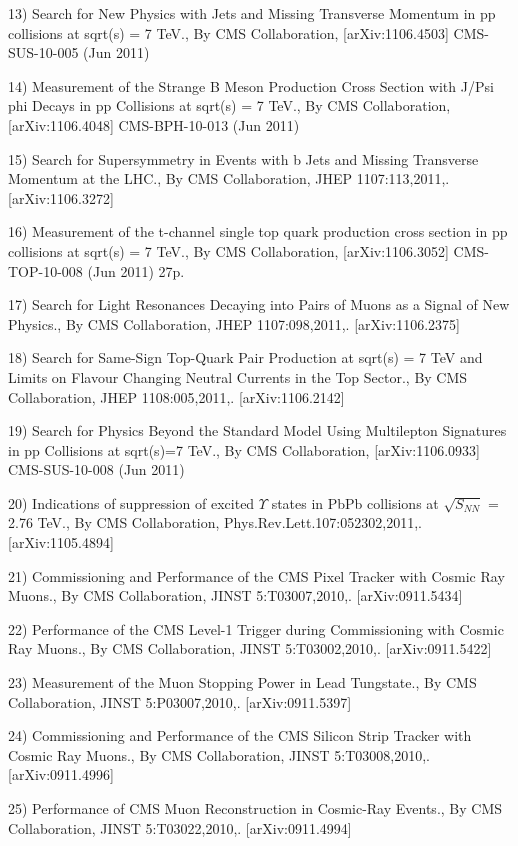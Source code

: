 \documentclass[10pt]{article}
\newenvironment{outerlist}[1][\enskip\textbullet]%
        {\begin{itemize}[#1]}{\end{itemize}%
         \vspace{-.6\baselineskip}}
\newenvironment{innerlist}[1][\enskip\textbullet]%
        {\begin{compactitem}[#1]}{\end{compactitem}}
\begin{document}
\begin{outerlist}
\begin{innerlist}
\item 13) Search for New Physics with Jets and Missing Transverse Momentum in pp collisions at sqrt(s) = 7 TeV., By CMS Collaboration, [arXiv:1106.4503] CMS-SUS-10-005 (Jun 2011)
\item 14) Measurement of the Strange B Meson Production Cross Section with J/Psi phi Decays in pp Collisions at sqrt(s) = 7 TeV., By CMS Collaboration, [arXiv:1106.4048] CMS-BPH-10-013 (Jun 2011)
\item 15) Search for Supersymmetry in Events with b Jets and Missing Transverse Momentum at the LHC., By CMS Collaboration, JHEP 1107:113,2011,. [arXiv:1106.3272]
\item 16) Measurement of the t-channel single top quark production cross section in pp collisions at sqrt(s) = 7 TeV., By CMS Collaboration, [arXiv:1106.3052] CMS-TOP-10-008 (Jun 2011) 27p.
\item 17) Search for Light Resonances Decaying into Pairs of Muons as a Signal of New Physics., By CMS Collaboration, JHEP 1107:098,2011,. [arXiv:1106.2375]
\item 18) Search for Same-Sign Top-Quark Pair Production at sqrt(s) = 7 TeV and Limits on Flavour Changing Neutral Currents in the Top Sector., By CMS Collaboration, JHEP 1108:005,2011,. [arXiv:1106.2142]
\item 19) Search for Physics Beyond the Standard Model Using Multilepton Signatures in pp Collisions at sqrt(s)=7 TeV., By CMS Collaboration, [arXiv:1106.0933] CMS-SUS-10-008 (Jun 2011)
\item 20) Indications of suppression of excited $\Upsilon$ states in PbPb collisions at $\sqrt{S_{NN}}$ = 2.76 TeV., By CMS Collaboration, Phys.Rev.Lett.107:052302,2011,. [arXiv:1105.4894]
\item 21) Commissioning and Performance of the CMS Pixel Tracker with Cosmic Ray Muons., By CMS Collaboration, JINST 5:T03007,2010,. [arXiv:0911.5434]
\item 22) Performance of the CMS Level-1 Trigger during Commissioning with Cosmic Ray Muons., By CMS Collaboration, JINST 5:T03002,2010,. [arXiv:0911.5422]
\item 23) Measurement of the Muon Stopping Power in Lead Tungstate., By CMS Collaboration, JINST 5:P03007,2010,. [arXiv:0911.5397]
\item 24) Commissioning and Performance of the CMS Silicon Strip Tracker with Cosmic Ray Muons., By CMS Collaboration, JINST 5:T03008,2010,. [arXiv:0911.4996]
\item 25) Performance of CMS Muon Reconstruction in Cosmic-Ray Events., By CMS Collaboration, JINST 5:T03022,2010,. [arXiv:0911.4994]

\end{innerlist}
\end{outerlist}
\end{document}
